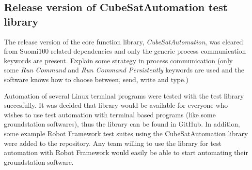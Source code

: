 \documentclass[english,12pt,a4paper,pdftex,elec,utf8]{aaltothesis}
\begin{document}
\subsection{Release version of CubeSatAutomation test library}
The release version of the core function library, \textit{CubeSatAutomation}, was cleared from Suomi100 related dependencies and only the generic process communication keywords are present. Explain some strategy in process communication (only some \textit{Run Command} and \textit{Run Command Persistently} keywords are used and the software knows how to choose between, send, write and type.)\par 
Automation of several Linux terminal programs were tested with the test library succesfully. It was decided that library would be available for everyone who wishes to use test automation with terminal based programs (like some groundstation softwares), thus the library can be found in GitHub. In addition, some example Robot Framework test suites using the CubeSatAutomation library were added to the repository. Any team willing to use the library for test automation with Robot Framework would easily be able to start automating their groundstation software.\par  
\end{document}
